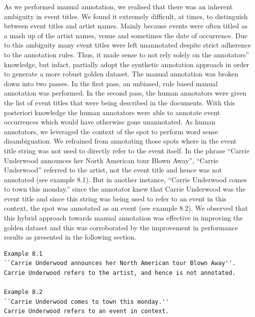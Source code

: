 \documentclass[a4paper,11pt]{report}
\begin{document}
As we performed manual annotation, we realised that there was an inherent ambiguity in event titles. We found it extremely difficult, at times, to distinguish between event titles and artist names. Mainly because events were often titled as a mash up of the artist names, venue and sometimes the date of occurrence. Due to this ambiguity many event titles were left unannotated despite strict adherence to the annotation rules. Thus, it made sense to not rely solely on the annotators'' knowledge, but infact, partially adopt the synthetic annotation approach in order to generate a more robust golden dataset. The manual annotation was broken down into two passes. In the first pass, an unbiased, rule based manual annotation was performed. In the second pass, the human annotators were given the list of event titles that were being described in the documents. With this posteriori knowledge the human annotators were able to annotate event occurrences which would have otherwise gone unannotated. As human annotators, we leveraged the context of the spot to perform word sense disambiguation. We refrained from annotating those spots where in the event title string was not used to directly refer to the event itself. In the phrase ``Carrie Underwood announces her North American tour Blown Away'', ``Carrie Underwood'' referred to the artist, not the event title and hence was not annotated (see example 8.1). But in another instance, ``Carrie Underwood comes to town this monday.'' since the annotator knew that Carrie Underwood was the event title and since this string was being used to refer to an event in this context, the spot was annotated as an event (see example 8.2). We observed that this hybrid approach towards manual annotation was effective in improving the golden dataset and this was corroborated by the improvement in performance results as presented in the following section. \newline

\begin{lstlisting}[caption =This listing shows examples of using context for word sense disambiguation during creation of Golden Dataset.]
Example 8.1
``Carrie Underwood announces her North American tour Blown Away''.
Carrie Underwood refers to the artist, and hence is not annotated.

Example 8.2
``Carrie Underwood comes to town this monday.''
Carrie Underwood refers to an event in context.
\end{lstlisting}

\end{document}
